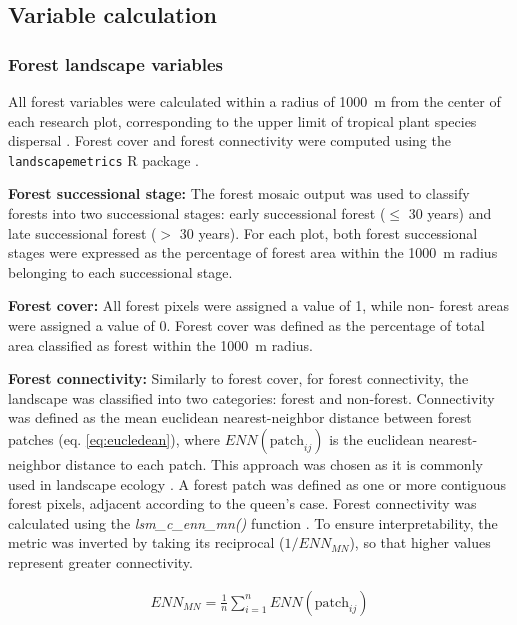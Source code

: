 \subsection{Variable calculation}

\subsubsection{Forest landscape variables}

All forest variables were calculated within a radius of 1000~m from the center of each research plot, corresponding to the upper limit of tropical plant species dispersal \citep{corlettSeedDispersalDistances2009}. Forest cover and forest connectivity were computed using the \texttt{landscapemetrics} R package \citep{hesselbarthLandscapemetricsOpensourceTool2019}.  

\textbf{Forest successional stage:}
The forest mosaic output was used to classify forests into two successional stages: early successional forest ($\leq$ 30 years) and late successional forest ($>$ 30 years). For each plot, both forest successional stages were expressed as the percentage of forest area within the 1000~m radius belonging to each successional stage. 

\textbf{Forest cover:}
All forest pixels were assigned a value of 1, while non- forest areas were assigned a value of 0. Forest cover was defined as the percentage of total area classified as forest within the 1000~m radius.

\textbf{Forest connectivity:}
Similarly to forest cover, for forest connectivity, the landscape was classified into two categories: forest and non-forest. Connectivity was defined as the mean euclidean nearest-neighbor distance between forest patches (eq. \ref{eq:eucledean}), where $ENN(\text{patch}_{ij})$ is the euclidean nearest-neighbor distance to each patch. This approach was chosen as it is commonly used in landscape ecology \citep{palmero2020changes, keeley2021connectivity}. A forest patch was defined as one or more contiguous forest pixels, adjacent according to the queen’s case. Forest connectivity was calculated using the \textit{lsm\_c\_enn\_mn()} function \citep{mcgarigal2002fragstats}. To ensure interpretability, the metric was inverted by taking its reciprocal ($1/ENN_{MN}$), so that higher values represent greater connectivity. 


\begin{align}
\label{eq:eucledean}
ENN_{MN} = \frac{1}{n} \sum_{i=1}^{n} ENN(\text{patch}_{ij})
\end{align}

